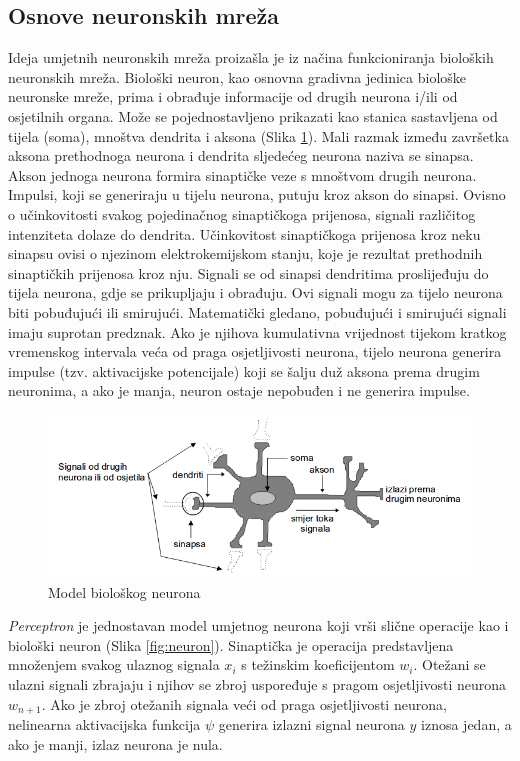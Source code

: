 \documentclass[times, utf8, diplomski]{fer}
\begin{document}
\subsection{Osnove neuronskih mreža}

Ideja umjetnih neuronskih mreža proizašla je iz načina funkcioniranja bioloških neuronskih mreža. Biološki neuron, kao osnovna gradivna jedinica biološke neuronske mreže, prima i obrađuje informacije od drugih neurona i/ili od osjetilnih organa. Može se pojednostavljeno prikazati kao stanica sastavljena od tijela (soma), mnoštva dendrita i aksona (Slika \ref{fig:bio-neuron}). Mali razmak između završetka aksona prethodnoga neurona i dendrita sljedećeg neurona naziva se sinapsa. Akson jednoga neurona formira sinaptičke veze s mnoštvom drugih neurona. Impulsi, koji se generiraju u tijelu neurona, putuju kroz akson do sinapsi. Ovisno o učinkovitosti svakog pojedinačnog sinaptičkoga prijenosa, signali različitog intenziteta dolaze do dendrita. Učinkovitost sinaptičkoga prijenosa kroz neku sinapsu ovisi o njezinom elektrokemijskom stanju, koje je rezultat prethodnih sinaptičkih prijenosa kroz nju. Signali se od sinapsi dendritima proslijeđuju do tijela neurona, gdje se prikupljaju i obrađuju. Ovi signali mogu za tijelo neurona biti pobuđujući ili smirujući. Matematički gledano, pobuđujući i smirujući signali imaju suprotan predznak. Ako je njihova kumulativna vrijednost tijekom kratkog vremenskog intervala veća od praga osjetljivosti neurona, tijelo neurona generira impulse (tzv. aktivacijske potencijale) koji se šalju duž aksona prema drugim neuronima, a ako je manja, neuron ostaje nepobuđen i ne generira impulse.

\begin{figure}[h]
\centering
\includegraphics[width=.9\textwidth]{bio_neuron}
\caption{Model biološkog neurona}
\label{fig:bio-neuron}
\end{figure}

\textit{Perceptron} je jednostavan model umjetnog neurona koji vrši slične operacije kao i biološki neuron (Slika \ref{fig:neuron}). Sinaptička je operacija predstavljena množenjem svakog ulaznog signala $x_i$ s težinskim koeficijentom $w_i$. Otežani se ulazni signali zbrajaju i njihov se zbroj uspoređuje s pragom osjetljivosti neurona $w_{n+1}$. Ako je zbroj otežanih signala veći od praga osjetljivosti neurona, nelinearna aktivacijska funkcija $\psi$ generira izlazni signal neurona $y$ iznosa jedan, a ako je manji, izlaz neurona je nula.
\end{document}
